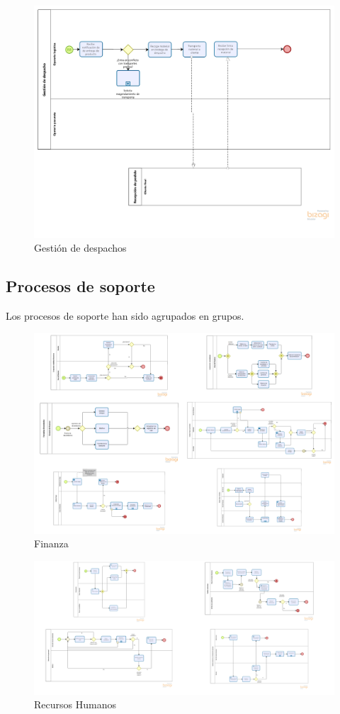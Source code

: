 \documentclass[11pt]{article}
\begin{document}
\begin{figure}[H]
\centering
\includegraphics[width=.9\linewidth]{./assets/build/gestion_despacho.png}
\caption{\label{fig:gest_despacho}Gestión de despachos}
\end{figure}

\subsection{Procesos de soporte}
Los procesos de soporte han sido agrupados en grupos.

\begin{figure}[H]
  \centering
  \includegraphics[width=.9\linewidth]{./assets/build/soporte/finanza/finanza.png}
  \caption{\label{fig:finanza} Finanza}
  \end{figure}

  
  \begin{figure}[H]
    \centering
    \includegraphics[width=.9\linewidth]{./assets/build/soporte/hr/hr.png}
    \caption{\label{fig:hr} Recursos Humanos}
    \end{figure}
  
\end{document}
